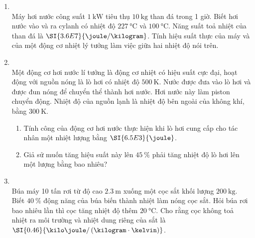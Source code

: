 \begin{enumerate}[label=\bfseries Câu \arabic*:, leftmargin=1.7cm]
\item {}\\
Máy hơi nước công suất $\SI{1}{\kilo\watt}$ tiêu thụ $\SI{10}{\kilogram}$ than đá trong 1 giờ. Biết hơi nước vào và ra cylanh có nhiệt độ $\SI{227}{\celsius}$ và $\SI{100}{\celsius}$. Năng suất toả nhiệt của than đá là $\SI{3.6E7}{\joule/\kilogram}$. Tính hiệu suất thực của máy và của một động cơ nhiệt lý tưởng làm việc giữa hai nhiệt độ nói trên.

\item {}\\
Một động cơ hơi nước lí tưởng là động cơ nhiệt có hiệu suất cực đại, hoạt động với nguồn nóng là lò hơi có nhiệt độ $\SI{500}{\kelvin}$. Nước được đưa vào lò hơi và được đun nóng để chuyển thể thành hơi nước. Hơi nước này làm piston chuyển động. Nhiệt độ của nguồn lạnh là nhiệt độ bên ngoài của không khí, bằng $\SI{300}{\kelvin}$.
\begin{enumerate}[label=\alph*)]
	\item Tính công của động cơ hơi nước thực hiện khi lò hơi cung cấp cho tác nhân một nhiệt lượng bằng $\SI{6.5E3}{\joule}$.
	\item Giả sử muốn tăng hiệu suất này lên $\SI{45}{\percent}$ phải tăng nhiệt độ lò hơi lên một lượng bằng bao nhiêu?
\end{enumerate}

\item {}\\
Búa máy 10 tấn rơi từ độ cao $\SI{2.3}{\meter}$ xuống một cọc sắt khối lượng $\SI{200}
{\kilogram}$. Biết $\SI{40}{\percent}$ động năng của búa biến thành nhiệt làm nóng cọc sắt. Hỏi búa rơi bao nhiêu lần thì cọc tăng nhiệt độ thêm $\SI{20}{\celsius}$. Cho rằng cọc không toả nhiệt ra môi trường và nhiệt dung riêng của sắt là $\SI{0.46}{\kilo\joule/\left(\kilogram\cdot\kelvin\right)}$.
\end{enumerate}
